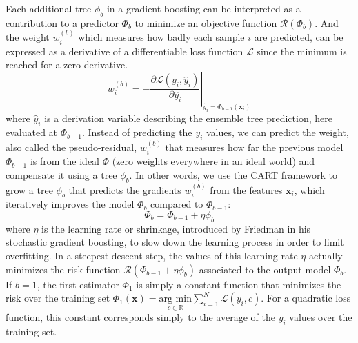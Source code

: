 \documentclass[main]{subfiles}
\begin{document}
Each additional tree $\phi_{b}$ in a gradient boosting can be interpreted as a contribution to a predictor $\Phi_{b}$ to minimize an objective function $\mathcal{R}(\Phi_{b})$. And the weight $w_i^{(b)}$ which measures how badly each sample $i$ are predicted, can be expressed as a derivative of a differentiable loss function $\mathcal{L}$ since the minimum is reached for a zero derivative. 
\begin{equation}
  w_i^{(b)} = -\left.\frac{\partial\mathcal{L}\left(y_i,\hat{y}_i\right)}{\partial\hat{y}_i}\right|_{\hat{y}_i=\Phi_{b-1}(\mathbf{x}_i)}
\end{equation}
where $\hat{y}_i$ is a derivation variable describing the ensemble tree prediction, here evaluated at $\Phi_{b-1}$. Instead of predicting the $y_i$ values, we can predict the weight, also called the pseudo-residual, $w_i^{(b)}$ that measures how far the previous model $\Phi_{b-1}$ is from the ideal $\Phi$ (zero weights everywhere in an ideal world) and compensate it using a tree $\phi_{b}$. In other words, we use the CART framework to grow a tree $\phi_{b}$ that predicts the gradients $w_i^{(b)}$ from the features $\mathbf{x}_i$, which iteratively improves the model $\Phi_b$ compared to $\Phi_{b-1}$: 
\begin{equation}
  \Phi_b = \Phi_{b-1} + \eta \phi_{b}
\end{equation}
where $\eta$ is the learning rate or shrinkage, introduced by Friedman in his stochastic gradient boosting, to slow down the learning process in order to limit overfitting.\autocite{Friedman2002} In a steepest descent step, the values of this learning rate $\eta$ actually minimizes the risk function $\mathcal{R}(\Phi_{b-1} + \eta \phi_{b})$ associated to the output model $\Phi_b$. If $b=1$, the first estimator $\Phi_1$ is simply a constant function that minimizes the risk over the training set $\Phi_1(\mathbf{x}) = \underset{c\in \mathbb{R}}{\text{arg min}} \sum_{i=1}^{N}\mathcal{L}(y_i,c)$. For a quadratic loss function, this constant corresponds simply to the average of the $y_i$ values over the training set.
\end{document}
